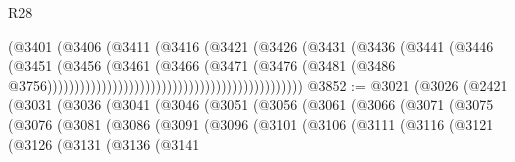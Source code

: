 \begin{lexlean}{R28}
\begin{coremodule}
                                                              (@3401
                                                                (@3406
                                                                  (@3411
                                                                    (@3416
                                                                      (@3421
                                                                        (@3426
                                                                          (@3431
                                                                            (@3436
                                                                              (@3441
                                                                                (@3446
                                                                                  (@3451
                                                                                    (@3456
                                                                                      (@3461
                                                                                        (@3466
                                                                                          (@3471
                                                                                            (@3476
                                                                                              (@3481
                                                                                                (@3486
                                                                                                  @3756)))))))))))))))))))))))))))))))))))))))))))))))
@3852 := @3021
    (@3026
      (@2421
        (@3031
          (@3036
            (@3041
              (@3046
                (@3051
                  (@3056
                    (@3061
                      (@3066
                        (@3071
                          (@3075
                            (@3076
                              (@3081
                                (@3086
                                  (@3091
                                    (@3096
                                      (@3101
                                        (@3106
                                          (@3111
                                            (@3116
                                              (@3121
                                                (@3126
                                                  (@3131
                                                    (@3136
                                                      (@3141

\end{coremodule}
\end{lexlean}
